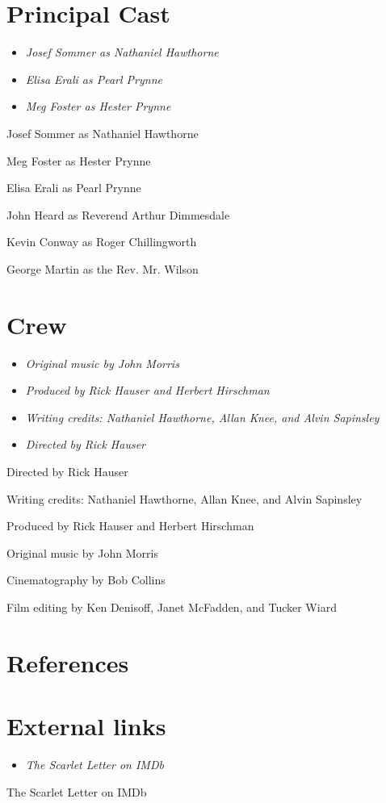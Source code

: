 \section{Principal Cast}\label{principal-cast}

\begin{itemize}
\item
  \emph{Josef Sommer as Nathaniel Hawthorne}
\item
  \emph{Elisa Erali as Pearl Prynne}
\item
  \emph{Meg Foster as Hester Prynne}
\end{itemize}

Josef Sommer as Nathaniel Hawthorne

Meg Foster as Hester Prynne

Elisa Erali as Pearl Prynne

John Heard as Reverend Arthur Dimmesdale

Kevin Conway as Roger Chillingworth

George Martin as the Rev. Mr. Wilson

\section{Crew}\label{crew}

\begin{itemize}
\item
  \emph{Original music by John Morris}
\item
  \emph{Produced by Rick Hauser and Herbert Hirschman}
\item
  \emph{Writing credits: Nathaniel Hawthorne, Allan Knee, and Alvin
  Sapinsley}
\item
  \emph{Directed by Rick Hauser}
\end{itemize}

Directed by Rick Hauser

Writing credits: Nathaniel Hawthorne, Allan Knee, and Alvin Sapinsley

Produced by Rick Hauser and Herbert Hirschman

Original music by John Morris

Cinematography by Bob Collins

Film editing by Ken Denisoff, Janet McFadden, and Tucker Wiard

\section{References}\label{references}

\section{External links}\label{external-links}

\begin{itemize}
\item
  \emph{The Scarlet Letter on IMDb}
\end{itemize}

The Scarlet Letter on IMDb
